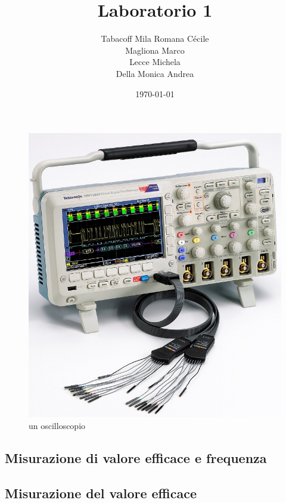 \documentclass[a4paper]{article}
\begin{document}
\title{Laboratorio 1}
\author{
        Tabacoff Mila Romana Cécile \\
        Magliona Marco \\
        Lecce Michela \\
        Della Monica Andrea}

\date{\today}
\maketitle


\begin{figure}[h]
\centering
\includegraphics[scale=0.5]{dso.jpg}
\caption{un oscilloscopio}
\end{figure}


\begin{tcolorbox}[breakable,colback=cyan,colframe=cyan]
\section*{Misurazione di valore efficace e frequenza}
\end{tcolorbox}

\subsection{Misurazione del valore efficace}
\end{document}
